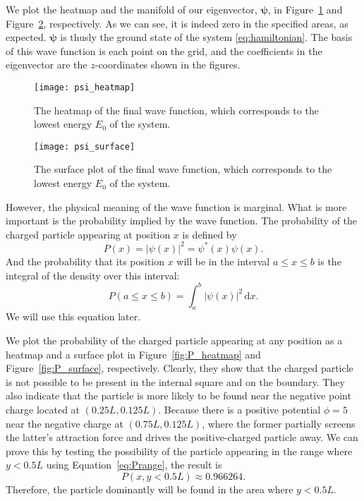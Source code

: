 We plot the heatmap and the manifold of our eigenvector, $\bm{\psi}$, in
Figure~\ref{fig:psi_heatmap} and Figure~\ref{fig:psi_surface}, respectively.
As we can see, it is indeed zero in the specified areas, as expected.
$\bm{\psi}$ is thusly the ground state of the system \eqref{eq:hamiltonian}.
The basis of this wave function is each point on the grid, and the coefficients
in the eigenvector are the $z$-coordinates shown in the figures.

\begin{figure}[!hbt]
    \centering
    \texttt{[image: psi\_heatmap]}
    \caption{The heatmap of the final wave function, which corresponds to the
        lowest energy $E_0$ of the system.}
    \label{fig:psi_heatmap}
\end{figure}

\begin{figure}[!hbt]
    \centering
    \texttt{[image: psi\_surface]}
    \caption{The surface plot of the final wave function, which corresponds to the
        lowest energy $E_0$ of the system.}
    \label{fig:psi_surface}
\end{figure}

However, the physical meaning of the wave function is marginal.
What is more important is the probability implied by the wave function.
The probability of the charged particle appearing at position $x$ is defined by
%
\begin{equation}
    P(x) = | \psi(x) |^2 = \psi^\ast(x) \psi(x).
\end{equation}
%
And the probability that its position $x$ will be in the interval $a \leq x \leq b$ is the
integral of the density over this interval:
%
\begin{equation}\label{eq:Prange}
    P(a \leq x \leq b) = \int_{a}^{b} | \psi(x) |^2 \, \mathrm{d}x.
\end{equation}
%
We will use this equation later.

We plot the probability of the charged particle appearing at any position
as a heatmap and a surface plot in Figure~\ref{fig:P_heatmap} and Figure~\ref{fig:P_surface},
respectively.
Clearly, they show that the charged particle is not possible to be present in the
internal square and on the boundary.
They also indicate that the particle is more likely to be found near the negative
point charge located at \((0.25L, 0.125L)\). Because there is a positive potential
$\phi = 5$ near the negative charge at \((0.75L, 0.125L)\), where the former partially
screens the latter's attraction force and drives the positive-charged particle away.
We can prove this by testing the possibility of the particle appearing in the
range where $y < 0.5L$ using Equation~\eqref{eq:Prange}, the result is
%
\begin{equation}
    P(x, y < 0.5L) \approx 0.966264.
\end{equation}
%
Therefore, the particle dominantly will be found in the area where $y < 0.5L$.

